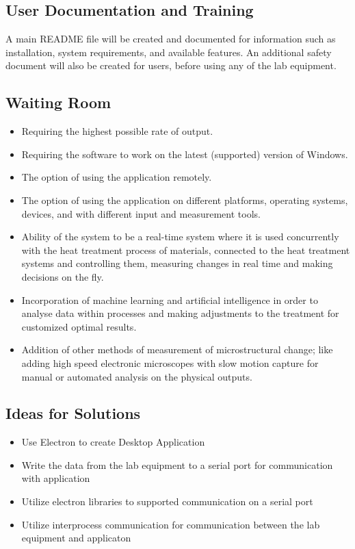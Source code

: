 \documentclass[12pt, titlepage]{article}
\begin{document}
\subsection{User Documentation and Training}
A main README file will be created and documented for information such as installation, system requirements, and available features. 
An additional safety document will also be created for users, before using any of the lab equipment. 

\subsection{Waiting Room}
\begin{itemize}
    \item Requiring the highest possible rate of output.
    \item Requiring the software to work on the latest (supported) version of Windows.
    \item The option of using the application remotely.
    \item The option of using the application on different platforms, operating systems, devices, and with different input and measurement tools.
    \item Ability of the system to be a real-time system where it is used concurrently with the heat treatment process of materials, connected to the heat treatment systems and controlling them, measuring changes in real time and making decisions on the fly.
    \item Incorporation of machine learning and artificial intelligence in order to analyse data within processes and making adjustments to the treatment for customized optimal results.
    \item Addition of other methods of measurement of microstructural change; like adding high speed electronic microscopes with slow motion capture for manual or automated analysis on the physical outputs.
\end{itemize}

\subsection{Ideas for Solutions}
\begin{itemize}
  \item Use Electron to create Desktop Application
  \item Write the data from the lab equipment to a serial port for communication with application
  \item Utilize electron libraries to supported communication on a serial port
  \item Utilize interprocess communication for communication between the lab equipment and applicaton
\end{itemize}
\end{document}
